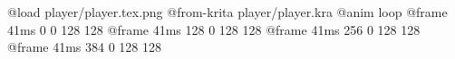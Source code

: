 @load player/player.tex.png
@from-krita player/player.kra
@anim loop
	@frame 41ms 0 0 128 128
	@frame 41ms 128 0 128 128
	@frame 41ms 256 0 128 128
	@frame 41ms 384 0 128 128
